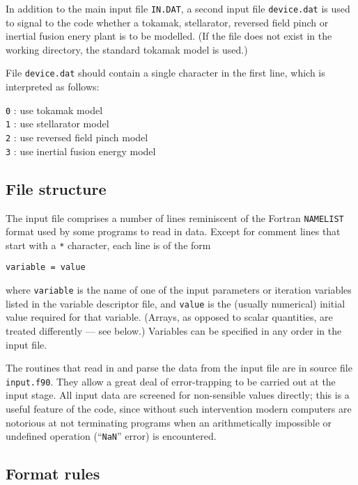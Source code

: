 \documentclass[11pt,a4paper]{report}
\begin{document}
In addition to the main input file \texttt{IN.DAT}, a second input file
\texttt{device.dat} is used to signal to the code whether a tokamak,
stellarator, reversed field pinch or inertial fusion enery plant is to be
modelled. (If the file does not exist in the working directory, the standard
tokamak model is used.)

File \texttt{device.dat} should contain a single character in the first
line, which is interpreted as follows:
\begin{tabbing}
\hspace{15mm}\= \texttt{0} : use tokamak model \\
\> \texttt{1} : use stellarator model \\
\> \texttt{2} : use reversed field pinch model \\
\> \texttt{3} : use inertial fusion energy model
\end{tabbing}

\subsection{File structure}

The input file comprises a number of lines reminiscent of the Fortran
\texttt{NAMELIST} format used by some programs to read in data. Except for
comment lines that start with a \texttt{*} character, each line is of the form
\begin{verbatim}
variable = value
\end{verbatim}
where \texttt{variable} is the name of one of the input parameters or
iteration variables listed in the variable descriptor file, and \texttt{value}
is the (usually numerical) initial value required for that variable. (Arrays,
as opposed to scalar quantities, are treated differently --- see below.)
Variables can be specified in any order in the input file.

The routines that read in and parse the data from the input file are in source
file \texttt{input.f90}. They allow a great deal of error-trapping to be
carried out at the input stage.  All input data are screened for non-sensible
values directly; this is a useful feature of the code, since without such
intervention modern computers are notorious at not terminating programs when
an arithmetically impossible or undefined operation (``\texttt{NaN}'' error)
is encountered.

\subsection{Format rules}
\end{document}
